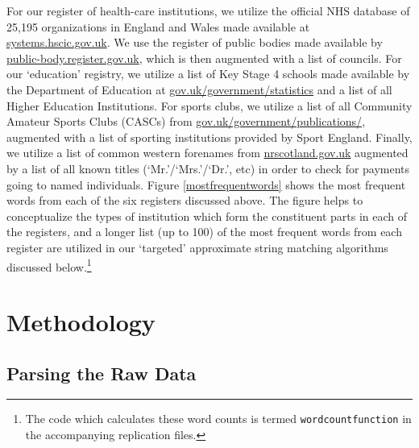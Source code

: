 \documentclass[11pt]{article}
\begin{document}
For our register of health-care institutions, we utilize the official NHS database of 25,195 organizations in England and Wales made available at \url{systems.hscic.gov.uk}. We use the register of public bodies made available by \url{public-body.register.gov.uk}, which is then augmented with a list of councils. For our ‘education’ registry, we utilize a list of Key Stage 4 schools made available by the Department of Education at \url{gov.uk/government/statistics} and a list of all Higher Education Institutions. For sports clubs, we utilize a list of all Community Amateur Sports Clubs (CASCs) from \url{gov.uk/government/publications/}, augmented with a list of sporting institutions provided by Sport England. Finally, we utilize a list of common western forenames from \url{nrscotland.gov.uk} augmented by a list of all known titles (`Mr.'/`Mrs.'/`Dr.', etc) in order to check for payments going to named individuals. Figure \ref{mostfrequentwords} shows the most frequent words from each of the six registers discussed above. The figure helps to conceptualize the types of institution which form the constituent parts in each of the registers, and a longer list (up to 100) of the most frequent words from each register are utilized in our `targeted' approximate string matching algorithms discussed below.\footnote{The code which calculates these word counts is termed \texttt{wordcountfunction} in the accompanying replication files.}

\section{Methodology}\label{methodology}

\subsection{Parsing the Raw Data}
\end{document}
